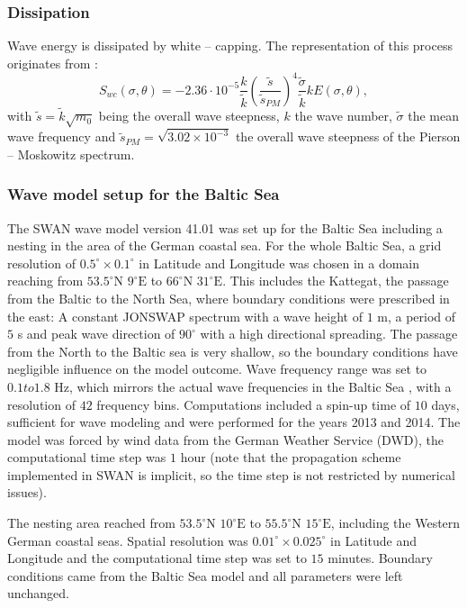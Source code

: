 \subsubsection{Dissipation}

Wave energy is dissipated by white -- capping. The representation of this process originates from \citep[][]{hasselmann1974}:
\begin{equation}
 S_{wc} (\sigma, \theta ) = - 2.36 \cdot 10^{-5} \frac{k}{\tilde{k}} \left( \frac{\tilde{s}}{\tilde{s}_{PM}} \right)^4 \frac{\tilde{\sigma}}{\tilde{k}} k E(\sigma, \theta),
\end{equation}
with $\tilde{s} = \tilde{k} \sqrt{m_0}$ being the overall wave steepness, $k$ the wave number, $\tilde{\sigma}$ the mean wave frequency and $\tilde{s}_{PM} = \sqrt{3.02 \times 10^{-3}}$ the overall wave steepness of the Pierson -- Moskowitz spectrum.


\subsubsection{Wave model setup for the Baltic Sea}\label{balticswan}

The SWAN wave model version 41.01 was set up for the Baltic Sea including a nesting in the area of the German coastal sea. For the whole Baltic Sea, a grid resolution of $0.5^\circ \times 0.1^\circ $ in Latitude and Longitude was chosen in a domain reaching from $53.5^\circ \text{N } 9^\circ \text{E}$ to $66^\circ \text{N } 31^\circ \text{E}$. This includes the Kattegat, the passage from the Baltic to the North Sea, where boundary conditions were prescribed in the east: A constant JONSWAP spectrum with a wave height of $1$ m, a period of $5$ s and peak wave direction of $90^\circ$ with a high directional spreading. The passage from the North to the Baltic sea is very shallow, so the boundary conditions have negligible influence on the model outcome. Wave frequency range was set to $0.1 to 1.8 \text{ Hz}$, which mirrors the actual wave frequencies in the Baltic Sea \citep[][]{balticsea}, with a resolution of $42$ frequency bins. Computations included a spin-up time of $10$ days, sufficient for wave modeling and were performed for the years 2013 and 2014. The model was forced by wind data from the German Weather Service (DWD), the computational time step was $1$ hour (note that the propagation scheme implemented in SWAN is implicit, so the time step is not restricted by numerical issues). 

The nesting area reached from $53.5^\circ \text{N } 10^\circ \text{E}$ to $55.5^\circ \text{N } 15^\circ \text{E}$, including the Western German coastal seas. Spatial resolution was $0.01^\circ \times 0.025^\circ $ in Latitude and Longitude and the computational time step was set to $15$ minutes. Boundary conditions came from the Baltic Sea model and all parameters were left unchanged.

